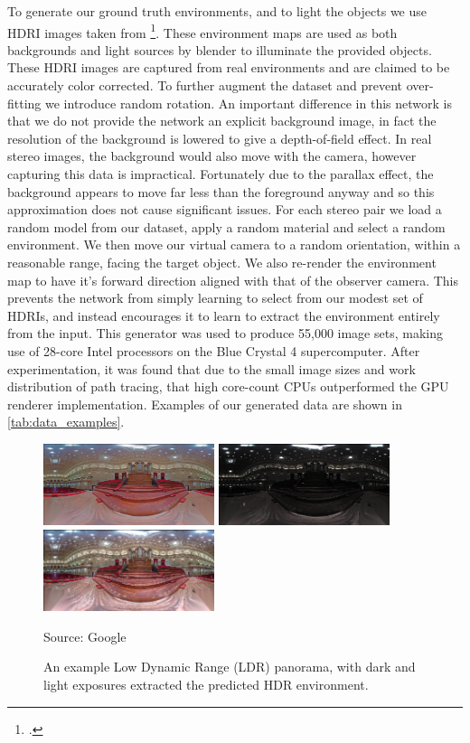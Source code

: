 \documentclass[ %
                    author={Gavin Parker},
                supervisor={Dr. Neill Campbell},
                    degree={MEng},
                     title={Deep Learning for Illumination Estimation from Stereo Images},
                  subtitle={},
                      type={Research},
                      year={2018} ]{dissertation}
\begin{document}
\newline
To generate our ground truth environments, and to light the objects we use HDRI images taken from \footcite{https://hdrihaven.com/}. These environment maps are used as both backgrounds and light sources by blender to illuminate the provided objects. These HDRI images are captured from real environments and are claimed to be accurately color corrected. To further augment the dataset and prevent over-fitting we introduce random rotation. An important difference in this network is that we do not provide the network an explicit background image, in fact the resolution of the background is lowered to give a depth-of-field effect. In real stereo images, the background would also move with the camera, however capturing this data is impractical. Fortunately due to the parallax effect, the background appears to move far less than the foreground anyway and so this approximation does not cause significant issues. For each stereo pair we load a random model from our dataset, apply a random material and select a random environment. We then move our virtual camera to a random orientation, within a reasonable range, facing the target object. We also re-render the environment map to have it's forward direction aligned with that of the observer camera. This prevents the network from simply learning to select from our modest set of HDRIs, and instead encourages it to learn to extract the environment entirely from the input. This generator was used to produce 55,000 image sets, making use of 28-core Intel processors on the Blue Crystal 4 supercomputer. After experimentation, it was found that due to the small image sizes and work distribution of path tracing, that high core-count CPUs outperformed the GPU renderer implementation. Examples of our generated data are shown in \ref{tab:data_examples}.
\begin{figure}
\center
\includegraphics[width=5cm]{images/google_example/original}
\includegraphics[width=5cm]{images/google_example/dark}
\includegraphics[width=5cm]{images/google_example/bright}
\caption{An example Low Dynamic Range (LDR) panorama, with dark and light exposures extracted the predicted HDR environment.}\label{fig:google}
Source: Google
\end{figure}
\end{document}
